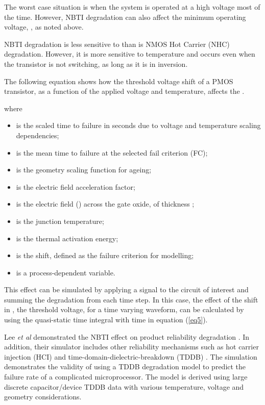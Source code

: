 \documentclass[11pt,a4paper]{article}
\begin{document}
The worst case situation is when the system is operated at a high voltage most of the time. However, NBTI degradation can also affect the minimum operating voltage, , as noted above.


NBTI degradation is less sensitive to  than is NMOS Hot Carrier (NHC) degradation. However, it is more sensitive to temperature \cite{Kimizuka} and occurs even when the transistor is not switching, as long as it is in inversion. 


The following equation shows how the threshold  voltage shift of a PMOS transistor, as a function of the applied voltage and temperature, affects the  \cite{Jha}.





where
\begin{itemize}\item is the scaled time to failure in seconds due to voltage and temperature scaling dependencies;
\item  is the mean time to failure at the selected fail criterion (FC);
\item  is the geometry scaling function for ageing;
\item  is the electric field acceleration factor;
\item  is the electric field  () across the gate oxide, of thickness ;
\item  is the junction temperature;
\item  is the thermal activation energy;
\item  is the  shift, defined as the failure criterion for modelling;
\item  is a process-dependent variable.
\end{itemize}

This effect can be simulated by applying a signal to the circuit of interest and 
summing the degradation from each time step. 
In this case, the effect of the shift in , the threshold voltage, for a time varying waveform, can be calculated by using the quasi-static time integral with time in equation  (\ref{eq5}).



Lee \textit{et al}  demonstrated the NBTI effect on product reliability degradation \cite{Lee}. 
In addition, their simulator  includes  other reliability mechanisms such as hot carrier injection (HCI) and time-domain-dielectric-breakdown (TDDB) \cite{Lee}. The simulation demonstrates the validity of using a TDDB degradation model to predict the failure rate of a complicated microprocessor. The model is derived using large discrete capacitor/device TDDB data with various temperature, voltage and geometry considerations.
\end{document}
